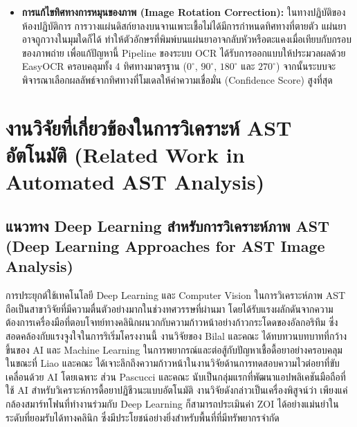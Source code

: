 \begin{itemize}
  \item \textbf{การแก้ไขทิศทางการหมุนของภาพ (Image Rotation Correction):} ในทางปฏิบัติของห้องปฏิบัติการ การวางแผ่นดิสก์ยาลงบนจานเพาะเชื้อไม่ได้มีการกำหนดทิศทางที่ตายตัว แผ่นยาอาจถูกวางในมุมใดก็ได้ ทำให้ตัวอักษรที่พิมพ์บนแผ่นยาอาจกลับหัวหรือตะแคงเมื่อเทียบกับกรอบของภาพถ่าย เพื่อแก้ปัญหานี้ Pipeline ของระบบ OCR ได้รับการออกแบบให้ประมวลผลด้วย EasyOCR ครอบคลุมทั้ง 4 ทิศทางมาตรฐาน ($0^\circ$, $90^\circ$, $180^\circ$ และ $270^\circ$) จากนั้นระบบจะพิจารณาเลือกผลลัพธ์จากทิศทางที่โมเดลให้ค่าความเชื่อมั่น (Confidence Score) สูงที่สุด
\end{itemize}

\section{งานวิจัยที่เกี่ยวข้องในการวิเคราะห์ AST อัตโนมัติ (Related Work in Automated AST Analysis)}

\subsection{แนวทาง Deep Learning สำหรับการวิเคราะห์ภาพ AST (Deep Learning Approaches for AST Image Analysis)}

การประยุกต์ใช้เทคโนโลยี Deep Learning และ Computer Vision ในการวิเคราะห์ภาพ AST ถือเป็นสาขาวิจัยที่มีความตื่นตัวอย่างมากในช่วงทศวรรษที่ผ่านมา โดยได้รับแรงผลักดันจากความต้องการเครื่องมือที่ตอบโจทย์ทางคลินิกผนวกกับความก้าวหน้าอย่างก้าวกระโดดของอัลกอริทึม ซึ่งสอดคล้องกับแรงจูงใจในการริเริ่มโครงงานนี้ งานวิจัยของ Bilal และคณะ \cite{bilal2025} ได้ทบทวนบทบาทที่กว้างขึ้นของ AI และ Machine Learning ในการพยากรณ์และต่อสู้กับปัญหาเชื้อดื้อยาอย่างครอบคลุม ในขณะที่ Liao และคณะ \cite{liao2025} ได้เจาะลึกถึงความก้าวหน้าในงานวิจัยด้านการทดสอบความไวต่อยาที่ขับเคลื่อนด้วย AI โดยเฉพาะ
ส่วน Pascucci และคณะ \cite{pascucci2021,pascucci2020preprint} นับเป็นกลุ่มแรกที่พัฒนาแอปพลิเคชันมือถือที่ใช้ AI สำหรับวิเคราะห์การดื้อยาปฏิชีวนะแบบอัตโนมัติ งานวิจัยดังกล่าวเป็นเครื่องพิสูจน์ว่า เพียงแค่กล้องสมาร์ทโฟนที่ทำงานร่วมกับ Deep Learning ก็สามารถประเมินค่า ZOI ได้อย่างแม่นยำในระดับที่ยอมรับได้ทางคลินิก ซึ่งมีประโยชน์อย่างยิ่งสำหรับพื้นที่ที่มีทรัพยากรจำกัด

